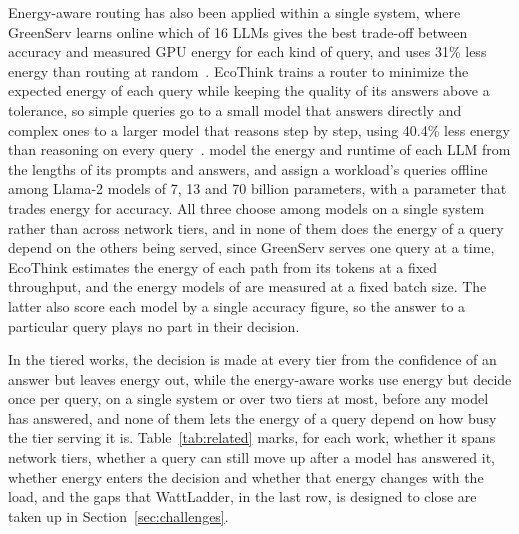 \documentclass[cic,dipl,english]{infufrgs}
\begin{document}
Energy-aware routing has also been applied within a single system, where GreenServ
learns online which of 16 LLMs gives the best trade-off between accuracy and measured GPU
energy for each kind of query, and uses 31\% less energy than routing at
random~\cite{ziller2026greenserv}. EcoThink trains a router to minimize the expected
energy of each query while keeping the quality of its answers above a tolerance, so
simple queries go to a small model that answers directly and complex ones to a larger
model that reasons step by step, using 40.4\% less energy than reasoning on every
query~\cite{li2026ecothink}.
 model the energy and runtime of each LLM from the lengths
of its prompts and answers, and assign a workload's queries offline among Llama-2 models
of 7, 13 and 70 billion parameters, with a parameter that trades energy for accuracy.
All three choose among models on a single system rather than across network tiers, and
in none of them does the energy of a query depend on the others being served, since
GreenServ serves one query at a time, EcoThink estimates the energy of each path from its
tokens at a fixed throughput, and the energy models of
 are measured at a fixed batch size. The latter also score each
model by a single accuracy figure, so the answer to a particular query plays no part in
their decision.

In the tiered works, the decision is made at every tier from the confidence of an
answer but leaves energy out, while the energy-aware works use energy but decide once
per query, on a single system or over two tiers at most, before any model has answered,
and none of them lets the energy of a query depend on how busy the tier serving it is.
Table~\ref{tab:related} marks, for each work, whether it spans network tiers, whether a
query can still move up after a model has answered it, whether energy enters the
decision and whether that energy changes with the load, and the gaps that WattLadder,
in the last row, is designed to close are taken up in Section~\ref{sec:challenges}.
\end{document}
